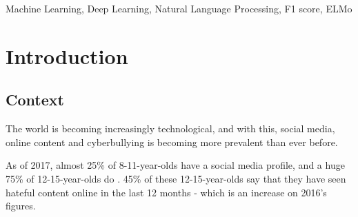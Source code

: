 \documentclass[12pt,a4paper]{article}
\begin{document}
\begin{abstract}
	{\bf Conclusions -- }
	The solution detects cyberbullying with rather high performance which renders the project a success, and it is concluded that \textit{Deep Learning} methods distinguish between \textit{types} of cyberbullying better than they can detect the presence of cyberbullying or not. However, a good underlying dataset is vital for success in this task, and the publicly available datasets are too small, likely due to the offensive nature of the messages which provides a deterrent for anyone wanting to gather such data. One might want to gather as much open-source data as possible, and combine these small datasets into one large corpus.
\end{abstract}

\begin{keywords}
	Machine Learning, Deep Learning, Natural Language Processing, F1 score, ELMo
\end{keywords}



\section{Introduction}

\subsection{Context}
The world is becoming increasingly technological, and with this, social media, online content and cyberbullying is becoming more prevalent than ever before. 
 
As of 2017, almost 25\% of 8-11-year-olds have a social media profile, and a huge 75\% of 12-15-year-olds do \cite[p.5]{Ofcom}. 45\% of these 12-15-year-olds say that they have seen hateful content online in the last 12 months - which is an increase on 2016's figures.
\end{document}
